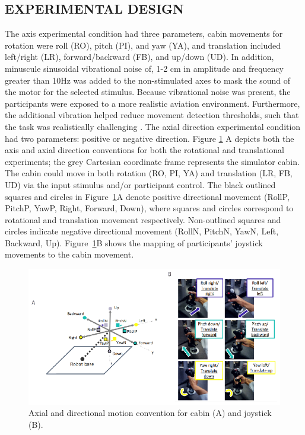 \subsection{EXPERIMENTAL DESIGN}
\label{EXPERIMENTAL_DESIGN}
The axis experimental condition had three parameters, cabin movements for rotation were roll (RO), pitch (PI), and yaw (YA), and translation included left/right (LR), forward/backward (FB), and up/down (UD). In addition, minuscule sinusoidal vibrational noise of, 1-2 cm in amplitude and frequency greater than 10Hz was added to the non-stimulated axes to mask the sound of the motor for the selected stimulus. Because vibrational noise was present, the participants were exposed to a more realistic aviation environment. Furthermore, the additional vibration helped reduce movement detection thresholds, such that the task was realistically challenging \cite{Chaudhuri_2013_Wholebody}. The axial direction experimental condition had two parameters: positive or negative direction. Figure \ref{fig1} A depicts both the axis and axial direction conventions for both the rotational and translational experiments; the grey Cartesian coordinate frame represents the simulator cabin. The cabin could move in both rotation (RO, PI, YA) and translation (LR, FB, UD) via the input stimulus and/or participant control. The black outlined squares and circles in Figure~\ref{fig1}A denote positive directional movement (RollP, PitchP, YawP, Right, Forward, Down), where squares and circles correspond to rotational and translation movement respectively. Non-outlined squares and circles indicate negative directional movement (RollN, PitchN, YawN, Left, Backward, Up). Figure~\ref{fig1}B shows the mapping of participants’ joystick movements to the cabin movement.

\begin{figure}[htp]
\begin{center}
\includegraphics[width=1.0\linewidth]{figures/figure1.eps}
\end{center}
\caption{Axial and directional motion convention for cabin (A) and joystick (B).}
\label{fig1}
\end{figure}

